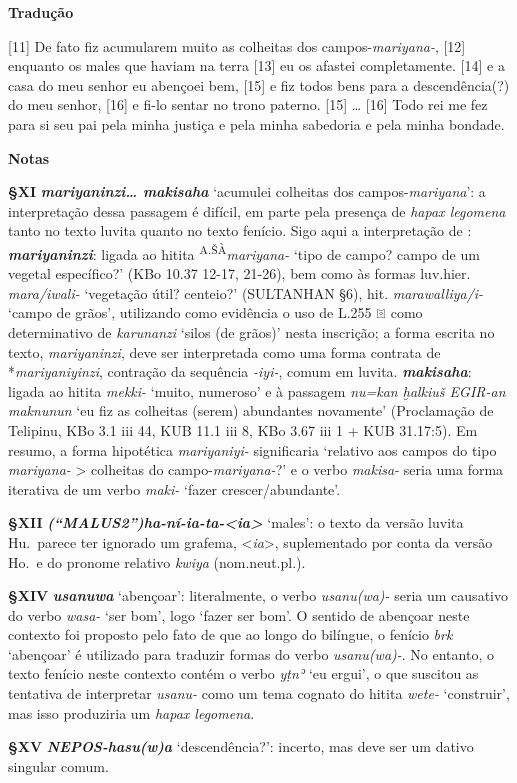 \bigskip%
\noindent\textbf{Tradução}

[11] De fato fiz acumularem muito as colheitas dos campos-\emph{mariyana-}, [12]
enquanto os males que haviam na terra [13] eu os afastei completamente.
	[14] e a casa do meu senhor eu abençoei bem, [15] e fiz todos bens para a
descendência{(?)} do meu senhor, [16] e fi-lo sentar no trono paterno. [15]
\ldots{} [16] Todo rei me fez para si seu pai pela minha justiça e pela minha
sabedoria e pela minha bondade.

\bigskip
\noindent\textbf{Notas}

\smallskip
\noindent\textbf{§XI}\tabto{2em}
\textbf{\emph{mariyaninzi\ldots{} makisaha}} `acumulei
colheitas dos campos-\emph{mariyana}': a interpretação dessa passagem
é difícil, em parte pela presença de \emph{hapax legomena} tanto no texto luvita
quanto no texto fenício.
Sigo aqui a interpretação de \citet{VanDenHout2010}:
\textbf{\emph{mariyaninzi}}: ligada ao hitita
\textsuperscript{A.ŠÀ}\emph{mariyana-} `tipo de
campo? campo de um vegetal específico?' (KBo 10.37 12-17, 21-26), bem como às
formas luv.hier. \emph{mara/iwali-} `vegetação útil? centeio?' (SULTANHAN §6),
hit. \emph{marawalliya/i-} `campo de grãos', utilizando como evidência o uso de
L.255 𔔡 como determinativo de \emph{karunanzi} `silos (de grãos)' nesta
inscrição;
a forma escrita no texto, \emph{mariyaninzi}, deve ser interpretada como uma
forma contrata de *\emph{mariyaniyinzi}, contração da sequência \emph{-iyi-},
comum em luvita.
\textbf{\emph{makisaha}}: ligada ao hitita \emph{mekki-} `muito, numeroso' e à
passagem \emph{nu=kan ḫalkiuš EGIR-an maknunun} `eu fiz as colheitas (serem)
abundantes novamente' (Proclamação de Telipinu, KBo 3.1 iii 44, KUB 11.1 iii 8,
KBo 3.67 iii 1 + KUB 31.17:5).
Em resumo, a forma hipotética \emph{mariyaniyi-} significaria `relativo aos
campos do tipo \emph{mariyana-} > colheitas do campo-\emph{mariyana-}?' e o
verbo \emph{makisa-} seria uma forma iterativa de um verbo \emph{maki-} `fazer
crescer/abundante'.


\smallskip
\noindent\textbf{§XII}\tabto{2em}
\textbf{\emph{\emph{(“MALUS2”)}ha-ní-ia-ta-<ia>}} `males': o texto da versão
luvita Hu.\ parece ter ignorado um grafema, <\emph{ia}>, suplementado por conta
da versão Ho.\ e do pronome relativo \emph{kwiya} (nom.neut.pl.).

\smallskip
\noindent\textbf{§XIV}\tabto{2em}
\textbf{\emph{usanuwa}} `abençoar': literalmente, o verbo \emph{usanu{(wa)}-}
seria um causativo do verbo \emph{wasa-} `ser bom', logo `fazer ser
bom'. O sentido de abençoar neste contexto foi proposto pelo fato de que ao
longo do bilíngue, o fenício \emph{brk} `abençoar' é utilizado para traduzir
formas do verbo \emph{usanu{(wa)}-}.
No entanto, o texto fenício neste contexto contém o verbo \emph{yṭnʾ} `eu
ergui', o que suscitou as tentativa de interpretar \emph{usanu-} como um tema
cognato do hitita \emph{wete-} `construir', mas isso produziria um \emph{hapax
	legomena}.

\smallskip
\noindent\textbf{§XV}\tabto{2em}
\textbf{\emph{\emph{NEPOS}-hasu{(w)}a}} `descendência?': incerto, mas deve ser
um dativo singular comum.
